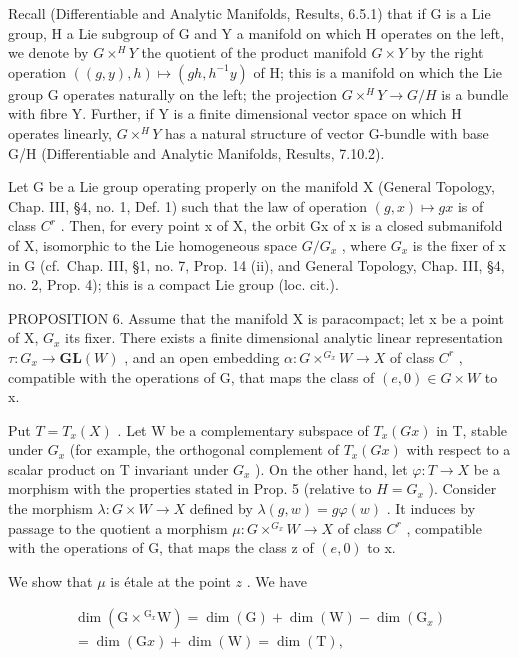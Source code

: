 Recall (Differentiable and Analytic Manifolds, Results, 6.5.1) that if G is a Lie group, H a Lie subgroup of G and Y a manifold on which H operates on the left, we denote by \(G \times^{H}Y\) the quotient of the product manifold \(G \times Y\) by the right operation \(((g,y),h) \mapsto (gh,h^{-1}y)\) of H; this is a manifold on which the Lie group G operates naturally on the left; the projection \(G \times^{H}Y \to G/H\) is a bundle with fibre Y. Further, if Y is a finite dimensional vector space on which H operates linearly, \(G \times^{H}Y\) has a natural structure of vector G-bundle with base G/H (Differentiable and Analytic Manifolds, Results, 7.10.2).

Let G be a Lie group operating properly on the manifold X (General Topology, Chap. III, §4, no. 1, Def. 1) such that the law of operation \((g, x) \mapsto gx\) is of class \(C^{r}\) . Then, for every point x of X, the orbit Gx of x is a closed submanifold of X, isomorphic to the Lie homogeneous space \(G/G_{x}\) , where \(G_{x}\) is the fixer of x in G (cf.~Chap. III, §1, no. 7, Prop. 14 (ii), and General Topology, Chap. III, §4, no. 2, Prop. 4); this is a compact Lie group (loc. cit.).

PROPOSITION 6. Assume that the manifold X is paracompact; let x be a point of X, \(G_{x}\) its fixer. There exists a finite dimensional analytic linear representation \(\tau: G_{x} \to \mathbf{GL}(W)\) , and an open embedding \(\alpha: G \times ^{G_{x}} W \to X\) of class \(C^{r}\) , compatible with the operations of G, that maps the class of \((e,0) \in G \times W\) to x.

Put \(T = T_{x}(X)\) . Let W be a complementary subspace of \(T_{x}(Gx)\) in T, stable under \(G_{x}\) (for example, the orthogonal complement of \(T_{x}(Gx)\) with respect to a scalar product on T invariant under \(G_{x}\) ). On the other hand, let \(\varphi : T \to X\) be a morphism with the properties stated in Prop. 5 (relative to \(H = G_{x}\) ). Consider the morphism \(\lambda : G \times W \to X\) defined by \(\lambda(g, w) = g\varphi(w)\) . It induces by passage to the quotient a morphism \(\mu : G \times^{G_{x}}W \to X\) of class \(C^{r}\) , compatible with the operations of G, that maps the class z of \((e, 0)\) to x.

We show that \(\mu\) is étale at the point \(z\) . We have

\[
\begin{array}{c} \dim (\mathrm{G} \times {} ^ {\mathrm{G} _ {x}} \mathrm{W}) = \dim (\mathrm{G}) + \dim (\mathrm{W}) - \dim (\mathrm{G} _ {x}) \\ = \dim (\mathrm{G} x) + \dim (\mathrm{W}) = \dim (\mathrm{T}), \end{array}
\]

